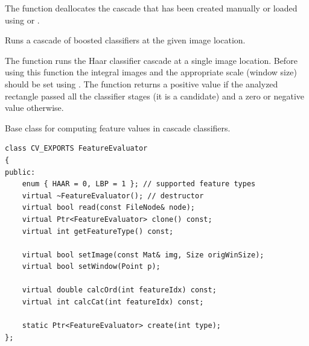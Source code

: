 \begin{description}
\end{description}

The function deallocates the cascade that has been created manually or loaded using  or .

Runs a cascade of boosted classifiers at the given image location.


\begin{description}
\end{description}

The function runs the Haar classifier
cascade at a single image location. Before using this function the
integral images and the appropriate scale (window size) should be set
using . The function returns
a positive value if the analyzed rectangle passed all the classifier stages
(it is a candidate) and a zero or negative value otherwise.

\fi

\fi

\ifCpp

Base class for computing feature values in cascade classifiers.

\begin{lstlisting}
class CV_EXPORTS FeatureEvaluator
{
public:
    enum { HAAR = 0, LBP = 1 }; // supported feature types
    virtual ~FeatureEvaluator(); // destructor
    virtual bool read(const FileNode& node);
    virtual Ptr<FeatureEvaluator> clone() const;
    virtual int getFeatureType() const;

    virtual bool setImage(const Mat& img, Size origWinSize);
    virtual bool setWindow(Point p);

    virtual double calcOrd(int featureIdx) const;
    virtual int calcCat(int featureIdx) const;

    static Ptr<FeatureEvaluator> create(int type);
};
\end{lstlisting}

